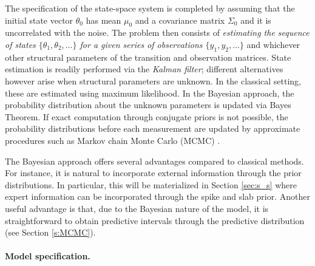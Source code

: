 


The specification of the state-space system is completed by assuming that the initial state vector $\theta_0$ has mean $\mu_0$ and a covariance matrix $\Sigma_0$ and it is uncorrelated with the noise. The problem then consists of \emph{estimating the sequence of states $\{\theta_1, \theta_2, \ldots\}$ for a given series of observations $\{y_1, y_2, \ldots\}$} and whichever other structural parameters of the transition and observation matrices. State estimation is readily performed via the \emph{Kalman filter};  different alternatives however arise  when structural parameters are unknown. In the classical setting, these are estimated using maximum likelihood. In the Bayesian approach, the probability distribution about the unknown parameters is updated via Bayes Theorem. If exact computation through conjugate priors is not possible, the probability distributions before each measurement are updated by approximate procedures such as Markov chain Monte Carlo (MCMC) \parencite{scott2014predicting}. 

The Bayesian approach offers several advantages compared to classical methods. For instance, it is natural to incorporate external information through the prior distributions. In particular, this will be materialized in Section \ref{sec:s_s} where expert information can be incorporated through the spike and slab prior. Another useful advantage is that, due to the Bayesian nature of the model, it is straightforward to obtain predictive intervals through the predictive distribution (see Section \ref{s:MCMC}).


\paragraph{Model specification.}\label{sec:model}





